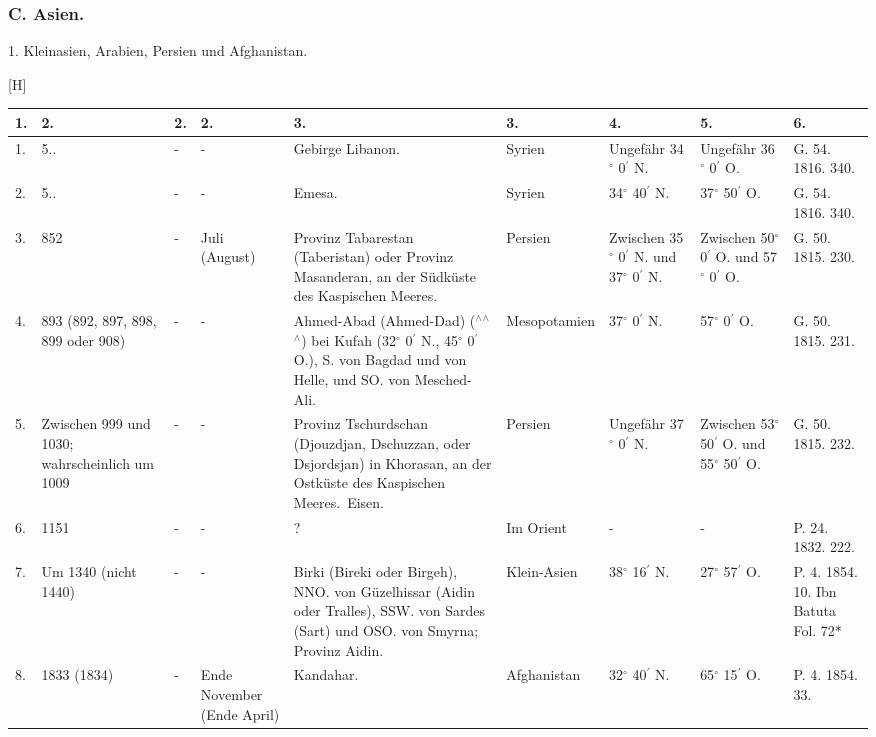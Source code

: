 \documentclass[a4paper, 8pt, oneside, polutonikogreek, german]{article}
\begin{document}
\subsubsection{C. Asien.}
1. Kleinasien, Arabien, Persien und Afghanistan.
\begin{center}[H]
    \footnotesize
    \begin{longtable}{|p{3mm}|p{12mm}|p{5mm}|p{13mm}|p{25mm}|p{17mm}|p{10mm}|p{10mm}|p{11mm}|}
    \hline
        1. & 2. & 2. & 2. & 3. & 3. & 4. & 5. & 6. \\ \hline
        1. & 5.. & - & - & Gebirge Libanon. & Syrien & Ungefähr 34$^\circ$ 0$^\prime$ N. & Ungefähr 36$^\circ$ 0$^\prime$ O. & G. 54. 1816. 340. \\ \hline
        2. & 5.. & - & - & Emesa. & Syrien & 34$^\circ$ 40$^\prime$ N. & 37$^\circ$ 50$^\prime$ O. & G. 54. 1816. 340. \\ \hline
        3. & 852 & - & Juli (August) & Provinz Tabarestan (Taberistan) oder Provinz Masanderan, an der Südküste des Kaspischen Meeres. & Persien & Zwischen 35$^\circ$ 0$^\prime$ N. und 37$^\circ$ 0$^\prime$ N. & Zwischen 50$^\circ$ 0$^\prime$ O. und 57$^\circ$ 0$^\prime$ O. & G. 50. 1815. 230. \\ \hline
        4. & 893 (892, 897, 898, 899 oder 908) & - & - & Ahmed-Abad (Ahmed-Dad) ($^\wedge$$^\wedge$$^\wedge$) bei Kufah (32$^\circ$ 0$^\prime$ N., 45$^\circ$ 0$^\prime$ O.), S. von Bagdad und von Helle, und SO. von Mesched-Ali. & Mesopotamien & 37$^\circ$ 0$^\prime$ N. & 57$^\circ$ 0$^\prime$ O. & G. 50. 1815. 231. \\ \hline
        5. & Zwischen 999 und 1030; wahrscheinlich um 1009 & - & - & Provinz Tschurdschan (Djouzdjan, Dschuzzan, oder Dsjordsjan) in Khorasan, an der Ostküste des Kaspischen Meeres. Eisen. & Persien & Ungefähr 37$^\circ$ 0$^\prime$ N. & Zwischen 53$^\circ$ 50$^\prime$ O. und 55$^\circ$ 50$^\prime$ O. & G. 50. 1815. 232. \\ \hline
        6. & 1151 & - & - & ? & Im Orient & - & - & P. 24. 1832. 222. \\ \hline
        7. & Um 1340 (nicht 1440) & - & - & Birki (Bireki oder Birgeh), NNO. von Güzelhissar (Aidin oder Tralles), SSW. von Sardes (Sart) und OSO. von Smyrna; Provinz Aidin. & Klein-Asien & 38$^\circ$ 16$^\prime$ N. & 27$^\circ$ 57$^\prime$ O. & P. 4. 1854. 10. Ibn Batuta Fol. 72* \\ \hline
        8. & 1833 (1834) & - & Ende November (Ende April) & Kandahar. & Afghanistan & 32$^\circ$ 40$^\prime$ N. & 65$^\circ$ 15$^\prime$ O. & P. 4. 1854. 33. \\ \hline

\end{longtable}
\end{center}
\end{document}
